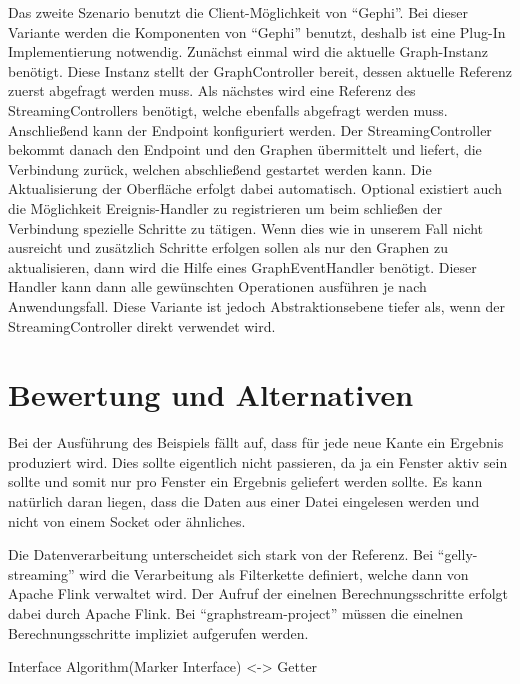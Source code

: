 Das zweite Szenario benutzt die Client-Möglichkeit von \enquote{Gephi}. Bei
dieser Variante werden die Komponenten von \enquote{Gephi} benutzt, deshalb
ist eine Plug-In Implementierung notwendig. Zunächst einmal wird die aktuelle
Graph-Instanz benötigt. Diese Instanz stellt der GraphController bereit, dessen
aktuelle Referenz zuerst abgefragt werden muss. Als nächstes wird eine Referenz
des StreamingControllers benötigt, welche ebenfalls abgefragt werden muss.
Anschließend kann der Endpoint konfiguriert werden. Der StreamingController
bekommt danach den Endpoint und den Graphen übermittelt und liefert, die
Verbindung zurück, welchen abschließend gestartet werden kann. Die Aktualisierung
der Oberfläche erfolgt dabei automatisch. Optional existiert auch die Möglichkeit
Ereignis-Handler zu registrieren um beim schließen der Verbindung spezielle
Schritte zu tätigen. Wenn dies wie in unserem Fall nicht ausreicht und zusätzlich
Schritte erfolgen sollen als nur den Graphen zu aktualisieren, dann wird die
Hilfe eines GraphEventHandler benötigt. Dieser Handler kann dann alle gewünschten
Operationen ausführen je nach Anwendungsfall. Diese Variante ist jedoch
Abstraktionsebene tiefer als, wenn der StreamingController direkt verwendet wird.


\section{Bewertung und Alternativen}

Bei der Ausführung des Beispiels fällt auf, dass für jede neue Kante ein
Ergebnis produziert wird. Dies sollte eigentlich nicht passieren, da ja ein
Fenster aktiv sein sollte und somit nur pro Fenster ein Ergebnis geliefert
werden sollte. Es kann natürlich daran liegen, dass die Daten aus einer Datei
eingelesen werden und nicht von einem Socket oder ähnliches.


Die Datenverarbeitung unterscheidet sich stark von der Referenz.
Bei \enquote{gelly-streaming} wird die Verarbeitung als Filterkette definiert,
welche dann von Apache Flink verwaltet wird. Der Aufruf der einelnen
Berechnungsschritte erfolgt dabei durch Apache Flink. Bei
\enquote{graphstream-project} müssen die einelnen Berechnungsschritte impliziet
aufgerufen werden. 

Interface Algorithm(Marker Interface) <-> Getter

